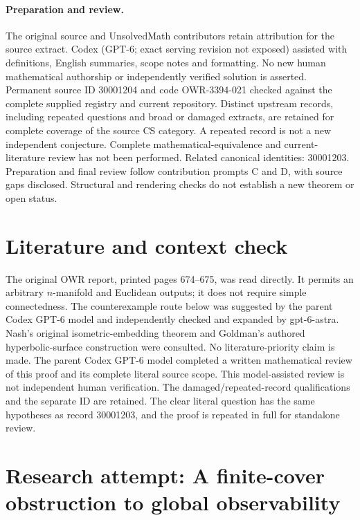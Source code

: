 \documentclass[11pt]{article}
\begin{document}
\paragraph{Preparation and review.}
The original source and UnsolvedMath contributors retain attribution for the source extract. Codex (GPT-6; exact serving revision not exposed) assisted with definitions, English summaries, scope notes and formatting. No new human mathematical authorship or independently verified solution is asserted. Permanent source ID 30001204 and code OWR-3394-021 checked against the complete supplied registry and current repository. Distinct upstream records, including repeated questions and broad or damaged extracts, are retained for complete coverage of the source CS category. A repeated record is not a new independent conjecture. Complete mathematical-equivalence and current-literature review has not been performed. Related canonical identities: 30001203. Preparation and final review follow contribution prompts C and D, with source gaps disclosed. Structural and rendering checks do not establish a new theorem or open status.
\label{end:30001204}

\section{Literature and context check}
The original OWR report, printed pages 674--675, was read directly. It permits an arbitrary $n$-manifold and Euclidean outputs; it does not require simple connectedness. The counterexample route below was suggested by the parent Codex GPT-6 model and independently checked and expanded by gpt-6-astra. Nash's original isometric-embedding theorem and Goldman's authored hyperbolic-surface construction were consulted. No literature-priority claim is made. The parent Codex GPT-6 model completed a written mathematical review of this proof and its complete literal source scope. This model-assisted review is not independent human verification. The damaged/repeated-record qualifications and the separate ID are retained. The clear literal question has the same hypotheses as record 30001203, and the proof is repeated in full for standalone review.
\section{Research attempt: A finite-cover obstruction to global observability}
\end{document}
